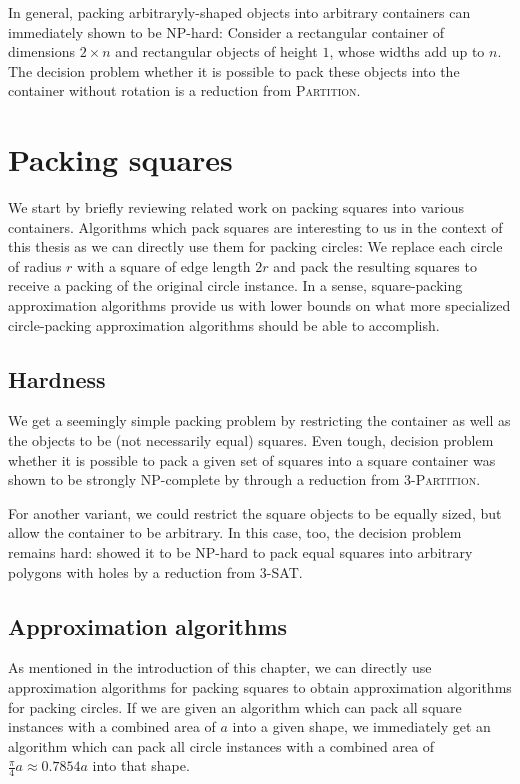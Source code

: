 \documentclass[a4paper,style=print,oneside,bibliography=totoc,nexus,lnum,extramargin]{tubsbook}
\begin{document}
In general, packing arbitraryly-shaped objects into arbitrary containers can immediately shown to be NP-hard: Consider a rectangular container of dimensions $2 \times n$ and rectangular objects of height $1$, whose widths add up to $n$. The decision problem whether it is possible to pack these objects into the container without rotation is a reduction from \textsc{Partition}.

\section{Packing squares}\label{sec:related-squares}

We start by briefly reviewing related work on packing squares into various containers.
Algorithms which pack squares are interesting to us in the context of this thesis as we can directly use them for packing circles: We replace each circle of radius $r$ with a square of edge length $2r$ and pack the resulting squares to receive a packing of the original circle instance. In a sense, square-packing approximation algorithms provide us with lower bounds on what more specialized circle-packing approximation algorithms should be able to accomplish.

\subsection{Hardness}

We get a seemingly simple packing problem by restricting the container as well as the objects to be (not necessarily equal) squares.
Even tough, decision problem whether it is possible to pack a given set of squares into a square container was shown to be strongly NP-complete by \textcite{LTWYC1990packing} through a reduction from \textsc{3-Partition}.

For another variant, we could restrict the square objects to be equally sized, but allow the container to be arbitrary.
In this case, too, the decision problem remains hard:
\textcite{FPT1981optimal} showed it to be NP-hard to pack equal squares into arbitrary polygons with holes by a reduction from \textsc{3-SAT}.

\subsection{Approximation algorithms}

As mentioned in the introduction of this chapter, we can directly use approximation algorithms for packing squares to obtain approximation algorithms for packing circles.
If we are given an algorithm which can pack all square instances with a combined area of $a$ into a given shape, we immediately get an algorithm which can pack all circle instances with a combined area of $\frac{\pi}{4}a \approx 0.7854a$ into that shape. 
\end{document}
